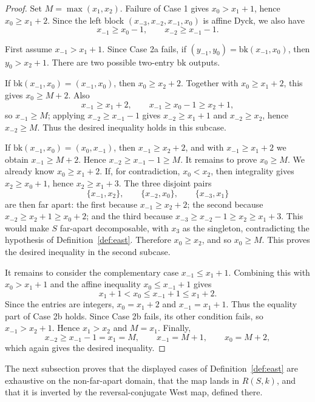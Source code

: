 \documentclass[11pt]{article}
\theoremstyle{plain}
\theoremstyle{definition}
\theoremstyle{remark}
\begin{document}
\begin{proof}
Set \(M=\max(x_1,x_2)\).  Failure of Case 1 gives
\(x_0>x_1+1\), hence \(x_0\ge x_1+2\).  Since the left block
\((x_{-3},x_{-2},x_{-1},x_0)\) is affine Dyck, we also have
\[
  x_{-1}\ge x_0-1,
  \qquad
  x_{-2}\ge x_{-1}-1.
\]

First assume \(x_{-1}>x_1+1\).  Since Case 2a fails, if
\((y_{-1},y_0)=\mathrm{bk}(x_{-1},x_0)\), then \(y_0>x_2+1\).
There are two possible two-entry \(\mathrm{bk}\) outputs.

If \(\mathrm{bk}(x_{-1},x_0)=(x_{-1},x_0)\), then
\(x_0\ge x_2+2\).  Together with \(x_0\ge x_1+2\), this gives
\(x_0\ge M+2\).  Also
\[
  x_{-1}\ge x_1+2,
  \qquad
  x_{-1}\ge x_0-1\ge x_2+1,
\]
so \(x_{-1}\ge M\); applying \(x_{-2}\ge x_{-1}-1\) gives
\(x_{-2}\ge x_1+1\) and \(x_{-2}\ge x_2\), hence \(x_{-2}\ge M\).
Thus the desired inequality holds in this subcase.

If \(\mathrm{bk}(x_{-1},x_0)=(x_0,x_{-1})\), then
\(x_{-1}\ge x_2+2\), and with \(x_{-1}\ge x_1+2\) we obtain
\(x_{-1}\ge M+2\).  Hence
\(x_{-2}\ge x_{-1}-1\ge M\).  It remains to prove \(x_0\ge M\).  We already
know \(x_0\ge x_1+2\).  If, for contradiction, \(x_0<x_2\), then integrality
gives \(x_2\ge x_0+1\), hence \(x_2\ge x_1+3\).  The three disjoint pairs
\[
  \{x_{-1},x_2\},
  \qquad
  \{x_{-2},x_0\},
  \qquad
  \{x_{-3},x_1\}
\]
are then far apart: the first because \(x_{-1}\ge x_2+2\); the second because
\(x_{-2}\ge x_2+1\ge x_0+2\); and the third because
\(x_{-3}\ge x_{-2}-1\ge x_2\ge x_1+3\).  This would make \(S\) far-apart
decomposable, with \(x_3\) as the singleton, contradicting the hypothesis of
Definition~\ref{def:east}.  Therefore \(x_0\ge x_2\), and so \(x_0\ge M\).
This proves the desired inequality in the second subcase.

It remains to consider the complementary case \(x_{-1}\le x_1+1\).  Combining
this with \(x_0>x_1+1\) and the affine inequality \(x_0\le x_{-1}+1\) gives
\[
  x_1+1<x_0\le x_{-1}+1\le x_1+2.
\]
Since the entries are integers, \(x_0=x_1+2\) and
\(x_{-1}=x_1+1\).  Thus the equality part of Case 2b holds.  Since Case 2b
fails, its other condition fails, so \(x_{-1}>x_2+1\).  Hence \(x_1>x_2\) and
\(M=x_1\).  Finally,
\[
  x_{-2}\ge x_{-1}-1=x_1=M,
  \qquad
  x_{-1}=M+1,
  \qquad
  x_0=M+2,
\]
which again gives the desired inequality.
\end{proof}

The next subsection proves that the displayed cases of
Definition~\ref{def:east} are exhaustive on the non-far-apart domain, that the
map lands in \(R(S,k)\), and that it is inverted by the reversal-conjugate West
map, defined there.
\end{document}
